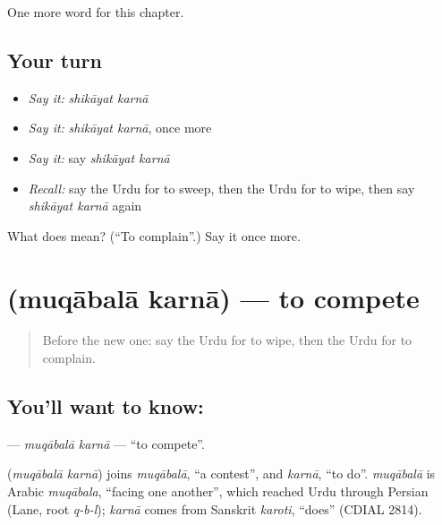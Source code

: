 \begin{grammarlens}[title={What you've built}]
One more word for this chapter.
\end{grammarlens}

\subsection*{Your turn}
\begin{itemize}
\raggedright
  \item \emph{Say it:} \emph{shikāyat karnā}
  \item \emph{Say it:} \emph{shikāyat karnā}, once more
  \item \emph{Say it:} say \emph{shikāyat karnā}
  \item \emph{Recall:} say the Urdu for to sweep, then the Urdu for to wipe, then say \emph{shikāyat karnā} again
\end{itemize}

\begin{tcolorbox}[breakable,colback=teal!4,colframe=teal!35!black,title={Before you move on}]
What does   mean? (\textquotedblleft{}To complain\textquotedblright{}.) Say it once more.
\end{tcolorbox}
\section[\texorpdfstring{\ur{مقابلہ} \ur{کرنا} (muqābalā karnā)}{مقابلہ کرنا (muqābalā karnā)}]{  (muqābalā karnā) — to compete}

\label{lesson:UR-C242-muqabala-karna}



\begin{quote}
Before the new one: say the Urdu for to wipe, then the Urdu for to complain.
\end{quote}

\subsection*{You'll want to know:  }
\textbf{ } — \emph{muqābalā karnā} — \textquotedblleft{}to compete\textquotedblright{}.

\begin{cousinweb}
\textbf{ } (\emph{muqābalā karnā}) joins \emph{muqābalā}, \textquotedblleft{}a contest\textquotedblright{}, and \emph{karnā}, \textquotedblleft{}to do\textquotedblright{}. \emph{muqābalā} is Arabic \emph{muqābala}, \textquotedblleft{}facing one another\textquotedblright{}, which reached Urdu through Persian (Lane, root \emph{q-b-l}); \emph{karnā} comes from Sanskrit \emph{karoti}, \textquotedblleft{}does\textquotedblright{} (CDIAL 2814).
\end{cousinweb}


